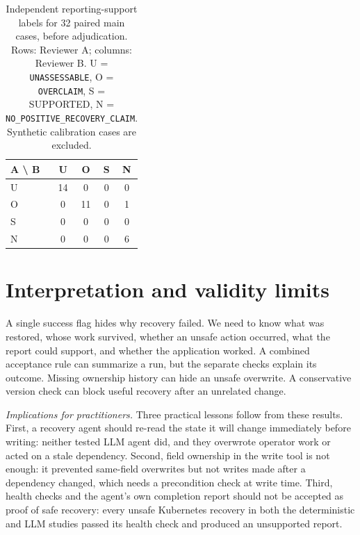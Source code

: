 \documentclass[conference,10pt]{IEEEtran}
\begin{document}
\begin{table}[!t]

\caption{Independent reporting\hyp{}support labels for 32 paired main cases, before adjudication. Rows: Reviewer A; columns: Reviewer B. U = \texttt{\mbox{UNASSESSABLE}}, O = \texttt{\mbox{OVERCLAIM}}, S = SUPPORTED, N = \texttt{\mbox{NO\_}\discretionary{}{}{}\mbox{POSITIVE\_}\discretionary{}{}{}\mbox{RECOVERY\_}\discretionary{}{}{}\mbox{CLAIM}}. Synthetic calibration cases are excluded.}

\label{tab:7}

\centering\footnotesize

\setlength{\tabcolsep}{6pt}

\renewcommand{\arraystretch}{1.12}

\begin{tabular}{lcccc}

\toprule

A \textbackslash{} B & U & O & S & N \\

\midrule

U & 14 & 0 & 0 & 0 \\

O & 0 & 11 & 0 & 1 \\

S & 0 & 0 & 0 & 0 \\

N & 0 & 0 & 0 & 6 \\

\bottomrule

\end{tabular}

\end{table}

\section{Interpretation and validity limits}

A single success flag hides why recovery failed. We need to know what was restored, whose work survived, whether an unsafe action occurred, what the report could support, and whether the application worked. A combined acceptance rule can summarize a run, but the separate checks explain its outcome. Missing ownership history can hide an unsafe overwrite. A conservative version check can block useful recovery after an unrelated change.

\emph{Implications for practitioners.} Three practical lessons follow from these results. First, a recovery agent should re\hyp{}read the state it will change immediately before writing: neither tested LLM agent did, and they overwrote operator work or acted on a stale dependency. Second, field ownership in the write tool is not enough: it prevented same\hyp{}field overwrites but not writes made after a dependency changed, which needs a precondition check at write time. Third, health checks and the agent's own completion report should not be accepted as proof of safe recovery: every unsafe Kubernetes recovery in both the deterministic and LLM studies passed its health check and produced an unsupported report.
\end{document}
